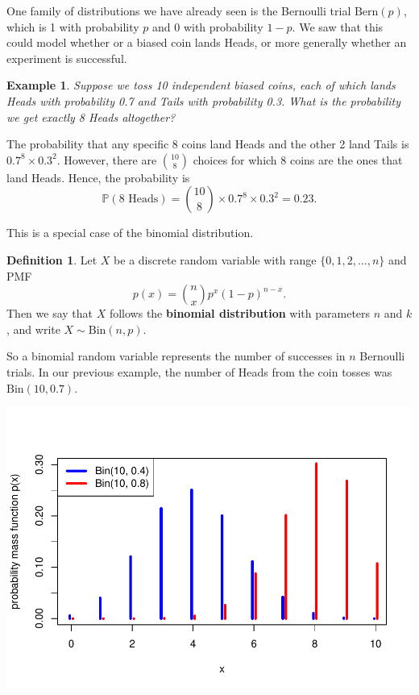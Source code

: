\documentclass[
  a4paper,
]{book}
\theoremstyle{definition}
\newtheorem{definition}{Definition}[chapter]
\theoremstyle{definition}
\newtheorem{example}{Example}[chapter]
\theoremstyle{definition}
\theoremstyle{definition}
\theoremstyle{remark}
\begin{document}
One family of distributions we have already seen is the Bernoulli trial \(\text{Bern}(p)\), which is 1 with probability \(p\) and 0 with probability \(1-p\). We saw that this could model whether or a biased coin lands Heads, or more generally whether an experiment is successful.

\begin{example}
\emph{Suppose we toss 10 independent biased coins, each of which lands Heads with probability 0.7 and Tails with probability 0.3. What is the probability we get exactly 8 Heads altogether?}

The probability that any specific 8 coins land Heads and the other 2 land Tails is \(0.7^8\times 0.3^2\). However, there are \(\binom{10}{8}\) choices for which 8 coins are the ones that land Heads. Hence, the probability is
\[ \mathbb P(\text{8 Heads}) = \binom{10}{8} \times 0.7^8 \times 0.3^2 = 0.23.\]
\end{example}

This is a special case of the binomial distribution.

\begin{definition}
Let \(X\) be a discrete random variable with range \(\{0,1,2,\dots,n\}\) and PMF
\[ p(x) = \binom{n}{x} p^x (1-p)^{n-x} . \]
Then we say that \(X\) follows the \textbf{binomial distribution} with parameters \(n\) and \(k\), and write \(X \sim \text{Bin}(n,p)\).
\end{definition}

So a binomial random variable represents the number of successes in \(n\) Bernoulli trials. In our previous example, the number of Heads from the coin tosses was \(\text{Bin}(10, 0.7)\).

\includegraphics{math1710_files/figure-latex/binom-pic-1.pdf}
\end{document}
